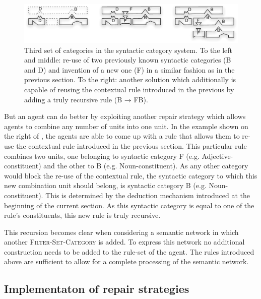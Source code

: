 \begin{figure}[htbp]
  \begin{center}
    \includegraphics[width=\textwidth]{./composition/figures/mapping-3.pdf}
    \caption[Third set of categories in the syntactic category
    system]{Third set of categories in the syntactic category system. To
      the left and middle: re-use of two previously known syntactic
      categories (B and D) and invention of a new one (F) in a similar
      fashion as in the previous section. To the right: another
      solution which additionally is capable of reusing the contextual
      rule introduced in the previous  by adding a truly
      recursive rule (B → FB).}
    \label{f:map-syntactic-categories-3}
  \end{center}
\end{figure}

But an agent can do better by exploiting another repair strategy
which allows agents to combine any number of units into one unit. In
the example shown on the right of , the agents are able to come up
with a rule that allows them to re-use the contextual rule introduced
in the previous section. This particular rule combines two units, one
belonging to syntactic category F (e.g. Adjective-constituent) and the
other to B (e.g. Noun-constituent). As any other category
would block the re-use of the contextual rule, the syntactic category to which
this new combination unit should belong, is
syntactic category B (e.g. Noun-constituent). This is determined by the deduction
mechanism introduced at the beginning of the current section. As this syntactic
category is equal to one of the rule's constituents, this new rule is
truly recursive.

This recursion becomes clear when considering a semantic network in
which another \textsc{Filter-Set-Category} is added. To express this
network no additional construction needs to be added to the rule-set of
the agent. The rules introduced above are sufficient to allow for a
complete processing of the semantic network.

\subsection{Implementaton of repair strategies}
\label{s:irl-fcg-repair-strategies}

